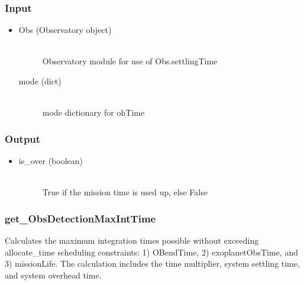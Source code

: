 \documentclass[cleanfoot]{asme2ej}
\begin{document}
\subsubsection*{Input}
\begin{itemize}
\item
\begin{description}
    \item[Obs (Observatory object)] \hfill \\ Observatory module for use of Obs.settlingTime
    \item[mode (dict)] \hfill \\ mode dictionary for ohTime
\end{description}
\end{itemize}
\subsubsection*{Output}
\begin{itemize}
\item 
\begin{description}
    \item[is\_over (boolean)] \hfill \\ True if the mission time is used up, else False
\end{description}
\end{itemize}

\subsubsection{get\_ObsDetectionMaxIntTime} \label{sec:get_ObsDetectionMaxIntTime}
Calculates the maximum integration times possible without exceeding allocate\_time scheduling constraints: 1) OBendTime, 2) exoplanetObsTime, and 3) missionLife. The calculation includes the time multiplier, system settling time, and system overhead time.
\end{document}
